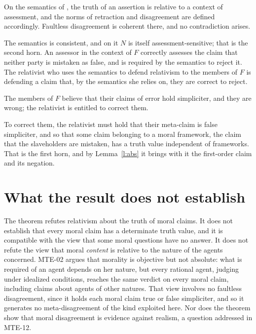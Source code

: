 \documentclass{situationist-preprint}
\begin{document}
\begin{objection}
On the semantics of \citet{MacFarlane2014}, the truth of an assertion is relative to a context of assessment, and the norms of retraction and disagreement are defined accordingly. Faultless disagreement is coherent there, and no contradiction arises.
\end{objection}

\begin{reply}
The semantics is consistent, and on it $N$ is itself assessment-sensitive; that is the second horn. An assessor in the context of $F$ correctly assesses the claim that neither party is mistaken as false, and is required by the semantics to reject it. The relativist who uses the semantics to defend relativism to the members of $F$ is defending a claim that, by the semantics she relies on, they are correct to reject.
\end{reply}

\begin{objection}
The members of $F$ believe that their claims of error hold simpliciter, and they are wrong; the relativist is entitled to correct them.
\end{objection}

\begin{reply}
To correct them, the relativist must hold that their meta-claim is false simpliciter, and so that some claim belonging to a moral framework, the claim that the slaveholders are mistaken, has a truth value independent of frameworks. That is the first horn, and by Lemma~\ref{l:abs} it brings with it the first-order claim and its negation.
\end{reply}

\section{What the result does not establish}

The theorem refutes relativism about the truth of moral claims. It does not establish that every moral claim has a determinate truth value, and it is compatible with the view that some moral questions have no answer. It does not refute the view that moral \emph{content} is relative to the nature of the agents concerned. MTE-02 argues that morality is objective but not absolute: what is required of an agent depends on her nature, but every rational agent, judging under idealized conditions, reaches the same verdict on every moral claim, including claims about agents of other natures. That view involves no faultless disagreement, since it holds each moral claim true or false simpliciter, and so it generates no meta-disagreement of the kind exploited here. Nor does the theorem show that moral disagreement is evidence against realism, a question addressed in MTE-12.
\end{document}
